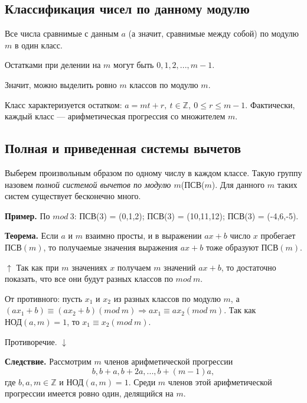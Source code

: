 \documentclass{article}
\begin{document}
        \subsection{Классификация чисел по данному модулю}
        	Все числа сравнимые с данным \(a\) (а значит, сравнимые между собой) по модулю \(m\) в один класс.

            Остатками при делении на \(m\) могут быть \(0,1,2,...,m - 1\).

            Значит, можно выделить ровно \(m\) классов по модулю \(m\).

            Класс характеризуется остатком: \( a = mt + r,\ t \in \mathbb{Z},\ 0 \leq r \leq m - 1 \). Фактически, каждый класс --- арифметическая прогрессия со множителем \(m\).
            
        \subsection{Полная и приведенная системы вычетов}
        	Выберем произвольным образом по одному числу в каждом классе. Такую группу назовем \textit{полной системой вычетов по модулю \(m\)}(ПСВ(\(m\)). Для данного \(m\) таких систем существует бесконечно много.

            \textbf{Пример.} По \(mod\ 3\): ПСВ(3) = (0,1,2); ПСВ(3) = (10,11,12); ПСВ(3) = (-4,6,-5).
            
            \textbf{Теорема.} Если $a$ и $m$ взаимно просты, и в выражении $ax + b$ число $x$ пробегает $\textrm{ПСВ}(m)$, то получаемые значения выражения $ax + b$ тоже образуют $\textrm{ПСВ}(m)$.
            
      		$\uparrow$ Так как при $m$ значениях $x$ получаем $m$ значений $ax + b$, то достаточно показать, что все они будут разных классов по $mod\ m$.
            
            От противного: пусть $x_1$ и $x_2$ из разных классов по модулю $m$, а $(ax_1 + b) \equiv (ax_2 + b)(mod\ m) \Rightarrow ax_1 \equiv ax_2(mod\ m)$. Так как $\textrm{НОД}(a,m) = 1$, то $x_1 \equiv x_2(mod\ m)$.
            
            Противоречие. $\downarrow$
            
            \textbf{Следствие.} Рассмотрим $m$ членов арифметической прогрессии 
            \[ b, b + a, b + 2a, ..., b + (m - 1)a, \]
            где $b,a,m \in \mathbb{Z}$ и $\textrm{НОД}(a,m) = 1$. Среди $m$ членов этой арифметической прогрессии имеется ровно один, делящийся на $m$.
            
\end{document}
